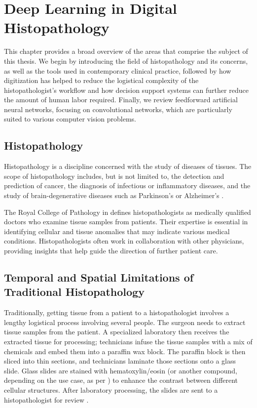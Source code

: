 \chapter{Deep Learning in Digital Histopathology}

This chapter provides a broad overview of the areas that comprise the subject of this thesis.
We begin by introducing the field of histopathology and its concerns, as well as the tools used in contemporary clinical practice, followed by how digitization has helped to reduce the logistical complexity of the histopathologist's workflow and how decision support systems can further reduce the amount of human labor required.
Finally, we review feedforward artificial neural networks, focusing on convolutional networks, which are particularly suited to various computer vision problems.

\section{Histopathology}

Histopathology is a discipline concerned with the study of diseases of tissues.
The scope of histopathology includes, but is not limited to, the detection and prediction of cancer, the diagnosis of infectious or inflammatory diseases, and the study of brain-degenerative diseases such as Parkinson's or Alzheimer's \cite{histopathology-cancer, histopathology-infectious, histopathology-inflammatory, histopathology-brain-degenerative}.

The Royal College of Pathology in \cite{histopathologist-role} defines histopathologists as medically qualified doctors who examine tissue samples from patients.
Their expertise is essential in identifying cellular and tissue anomalies that may indicate various medical conditions.
Histopathologists often work in collaboration with other physicians, providing insights that help guide the direction of further patient care.

\section{Temporal and Spatial Limitations of Traditional Histopathology}

Traditionally, getting tissue from a patient to a histopathologist involves a lengthy logistical process involving several people.
The surgeon needs to extract tissue samples from the patient.
A specialized laboratory then receives the extracted tissue for processing; technicians infuse the tissue samples with a mix of chemicals and embed them into a paraffin wax block.
The paraffin block is then sliced into thin sections, and technicians laminate those sections onto a glass slide.
Glass slides are stained with hematoxylin/eosin (or another compound, depending on the use case, as per \cite{histopathology-staining}) to enhance the contrast between different cellular structures.
After laboratory processing, the slides are sent to a histopathologist for review \cite{histo-process}.

